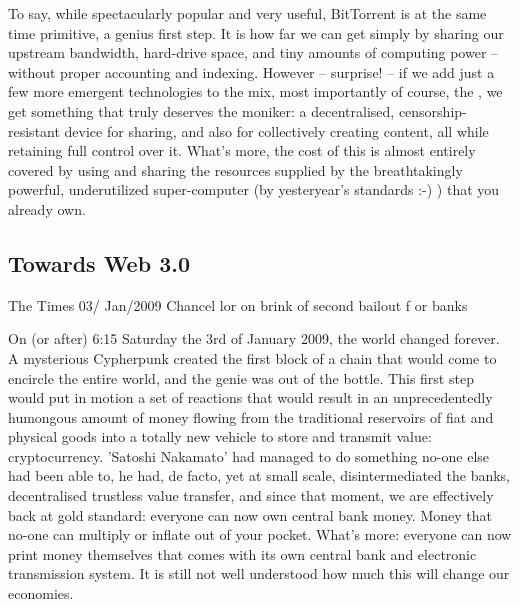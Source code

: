 To say, while spectacularly popular and very useful, BitTorrent is at the same time primitive, a genius first step. It is how far we can get simply by sharing our upstream bandwidth, hard-drive space, and tiny amounts of computing power – without proper accounting and indexing. However – surprise! – if we add just a few more emergent technologies to the mix, most importantly of course, the , we get something that truly deserves the  moniker: a decentralised, censorship-resistant device for sharing, and also for collectively creating content, all while retaining full control over it. What's more, the cost of this is almost entirely covered by using and sharing the resources supplied by the breathtakingly powerful, underutilized super-computer (by yesteryear's standards :-) ) that you already own.

\subsection{Towards Web 3.0 \statusgreen}\label{sec:towards-web3}


\begin{centerverbatim}
The Times 03/
Jan/2009 Chancel
lor on brink of 
second bailout f
or banks
\end{centerverbatim}

On (or after) 6:15 Saturday the 3rd of January 2009, the world changed forever. A mysterious Cypherpunk created the first block of a chain that would come to encircle the entire world, and the genie was out of the bottle. This first step would put in motion a set of reactions that would result in an unprecedentedly humongous amount of money flowing from the traditional reservoirs of fiat and physical goods into a totally new vehicle to store and transmit value: cryptocurrency. 'Satoshi Nakamato' had managed to do something no-one else had been able to, he had, de facto, yet at small scale, disintermediated the banks, decentralised trustless value transfer, and since that moment, we are effectively back at gold standard: everyone can now own central bank money. Money that no-one can multiply or inflate out of your pocket. What's more: everyone can now print money themselves that comes with its own central bank and electronic transmission system. It is still not well understood how much this will change our economies.

